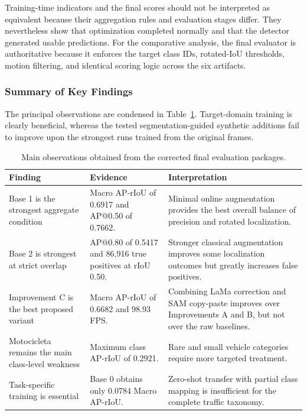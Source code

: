 Training-time indicators and the final scores should not be interpreted as equivalent because their aggregation rules and evaluation stages differ. They nevertheless show that optimization completed normally and that the detector generated usable predictions. For the comparative analysis, the final evaluator is authoritative because it enforces the target class IDs, rotated-IoU thresholds, motion filtering, and identical scoring logic across the six artifacts.

\subsubsection{Summary of Key Findings}
\label{sec:key_findings_results}

The principal observations are condensed in Table~\ref{tab:key_findings}. Target-domain training is clearly beneficial, whereas the tested segmentation-guided synthetic additions fail to improve upon the strongest runs trained from the original frames.

\begin{table}[!t]
  \caption{Main observations obtained from the corrected final evaluation packages.}
  \label{tab:key_findings}
  \centering
  \small
  \begin{tabular}{p{} p{} p{}}
    \toprule
    \textbf{Finding} & \textbf{Evidence} & \textbf{Interpretation} \\
    \midrule
    Base 1 is the strongest aggregate condition & Macro AP-rIoU of 0.6917 and AP@0.50 of 0.7662. & Minimal online augmentation provides the best overall balance of precision and rotated localization. \\
    Base 2 is strongest at strict overlap & AP@0.80 of 0.5417 and 86,916 true positives at rIoU 0.50. & Stronger classical augmentation improves some localization outcomes but greatly increases false positives. \\
    Improvement C is the best proposed variant & Macro AP-rIoU of 0.6682 and 98.93 FPS. & Combining LaMa correction and SAM copy-paste improves over Improvements A and B, but not over the raw baselines. \\
    Motocicleta remains the main class-level weakness & Maximum class AP-rIoU of 0.2921. & Rare and small vehicle categories require more targeted treatment. \\
    Task-specific training is essential & Base 0 obtains only 0.0784 Macro AP-rIoU. & Zero-shot transfer with partial class mapping is insufficient for the complete traffic taxonomy. \\
    \bottomrule
  \end{tabular}
\end{table}
